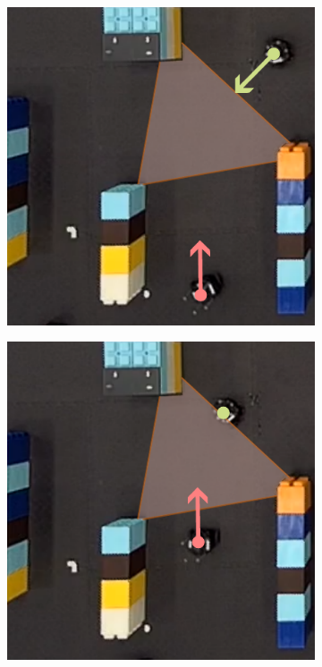 \documentclass[letterpaper, 10 pt, conference]{ieeeconf}  %
\begin{document}
\begin{figure}[t]
    \centering
    \begin{subfigure}[b]{.25\linewidth}
         \centering
         \includegraphics[width=\linewidth]{experiment/s_Page_1.pdf}
         \caption{}
         \label{fig:expS1}
     \end{subfigure}
     \begin{subfigure}[b]{.25\linewidth}
         \centering
         \includegraphics[width=\linewidth]{experiment/s_Page_2.pdf}

\end{subfigure}
\end{figure}
\end{document}
